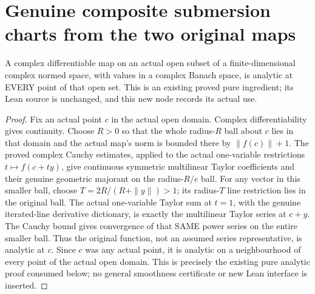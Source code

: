 \section{Genuine composite submersion charts from the two original maps}

\begin{theorem}
\label{hir:submersion-composition-holomorphic-analytic-ingredient}
\leanok
{}
A complex differentiable map on an actual open subset of a finite-dimensional
complex normed space, with values in a complex Banach space, is analytic
at EVERY point of that open set. This is an existing proved pure ingredient;
its Lean source is unchanged, and this new node records its actual use.
\end{theorem}
\begin{proof}
Fix an actual point $c$ in the actual open domain. Complex differentiability
gives continuity. Choose $R>0$ so that the whole radius-$R$ ball about $c$
lies in that domain and the actual map's norm is bounded there by
$\|f(c)\|+1$. The proved complex Cauchy estimates, applied to the actual
one-variable restrictions $t\mapsto f(c+ty)$, give continuous symmetric
multilinear Taylor coefficients and their genuine geometric majorant
on the radius-$R/e$ ball. For any vector in this smaller ball, choose
$T=2R/(R+\|y\|)>1$; its radius-$T$ line restriction lies in the original
ball. The actual one-variable Taylor sum at $t=1$, with the genuine
iterated-line derivative dictionary, is exactly the multilinear Taylor
series at $c+y$. The Cauchy bound gives convergence of that SAME power
series on the entire smaller ball. Thus the original function, not an
assumed series representative, is analytic at $c$. Since $c$ was any actual
point, it is analytic on a neighbourhood of every point of the actual
open domain. This is precisely the existing pure analytic proof consumed
below; no general smoothness certificate or new Lean interface is inserted.
\end{proof}

